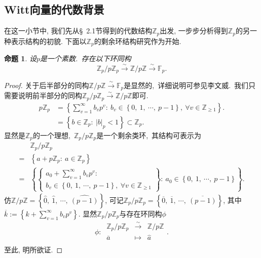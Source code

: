 \documentclass[UTF8, twoside]{ctexart}
\theoremstyle{nonumberplain}
\newtheorem{proof}{\heiti 证明}  %
\theoremstyle{nonumberplain}
\theoremstyle{plain}
\newtheorem{mingti}[dingyi]{命题}
\begin{document}
	\newpage
	\subsection{Witt向量的代数背景}
	在这一小节中, 我们先从\S~2.1节得到的代数结构${{\mathbb{Z}}_{p}}$出发, 一步步分析得到${{\mathbb{Z}}_{p}}$的另一种表示结构的初貌. 下面以${{\mathbb{Z}}_{p}}$的剩余环结构研究作为开始. 
	\begin{mingti} \label{Zp/pZp的等价表示}
		设$p$是一个素数.\ 存在以下环同构
		\[
			{{\mathbb{Z}}_{p}}/p{{\mathbb{Z}}_{p}}
			\xrightarrow{\sim}
			\mathbb{Z}/p\mathbb{Z}
			\xrightarrow{\sim}
			{{\mathbb{F}}_{p}}.
		\]
	\end{mingti}
	\begin{proof}
		关于后半部分的同构$\mathbb{Z}/p\mathbb{Z}
		\xrightarrow{\sim} 
		{{\mathbb{F}}_{p}}$是显然的,\ 详细说明可参见李文威\cite[例~5.2.4]{liwenwei}.\ 我们只需要说明前半部分的同构${{\mathbb{Z}}_{p}}/p{{\mathbb{Z}}_{p}}
		\xrightarrow{\sim}
		\mathbb{Z}/p\mathbb{Z}$即可.\ 
		\begin{align*}
			p{{\mathbb{Z}}_{p}}&=\left\{ \sum\limits_{v=1}^{\infty }{{{b}_{v}}{{p}^{v}}}:\ {{b}_{v}}\in \left\{ 0,\ 1,\ \cdots,\ p-1 \right\},
			\ \forall v\in {{\mathbb{Z}}_{\ge 1}} \right\}. \\ 
			&=\left\{ b\in {{\mathbb{Z}}_{p}}:
			\ {{\left| b \right|}_{p}}<1 \right\}
			\subset \mathbb{Z}_p. 
		\end{align*}
		显然是${{\mathbb{Z}}_{p}}$的一个理想,\ ${{\mathbb{Z}}_{p}}/p{{\mathbb{Z}}_{p}}$是一个剩余类环,\ 其结构可表示为
		\begin{align*}
			& {{\mathbb{Z}}_{p}}/p{{\mathbb{Z}}_{p}}\\
			=&\left\{ a+p{{\mathbb{Z}}_{p}}:\ a\in {{\mathbb{Z}}_{p}} \right\} \\ 
			=&\left\{ \left\{ \begin{gathered}
				 {{a}_{0}}+\sum\limits_{v=1}^{\infty }{{{b}_{v}}{{p}^{v}}}: \\ 
				 {{b}_{v}}\in \left\{ 0,\  1,\ \cdots ,\   p-1  \right\},\ \forall v\in {{\mathbb{Z}}_{\ge 1}} 
			\end{gathered} \right\}:\ {{a}_{0}}\in \left\{ 0,\  1,\ \cdots ,\   p-1  \right\} \right\}.
		\end{align*}
		仿$\mathbb{Z}/p\mathbb{Z}=\left\{ \widehat{0},\ \widehat{1},\ \cdots ,\ \widehat{\left( p-1 \right)} \right\}$, 可记${{\mathbb{Z}}_{p}}/p{{\mathbb{Z}}_{p}}=\left\{ \overline{0},\ \overline{1},\ \cdots ,\ \overline{\left( p-1 \right)} \right\}$, 其中
		$\overline{k}:=\left\{ k+\sum_{v=1}^{\infty }{{{b}_{v}}{{p}^{v}}} \right\}$.
		显然${{\mathbb{Z}}_{p}}/p{{\mathbb{Z}}_{p}}$与存在环同构$\phi $
		\[
			\phi :\ \begin{matrix}
				{{\mathbb{Z}}_{p}}/p{{\mathbb{Z}}_{p}} & \xrightarrow{\sim}  & \mathbb{Z}/p\mathbb{Z}  \\
				\overline{a} & \mapsto  & \widehat{a}  \\
			\end{matrix}.
		\]
		至此, 明所欲证.
	\end{proof}
	\vskip 0.5cm
	
\end{document}
